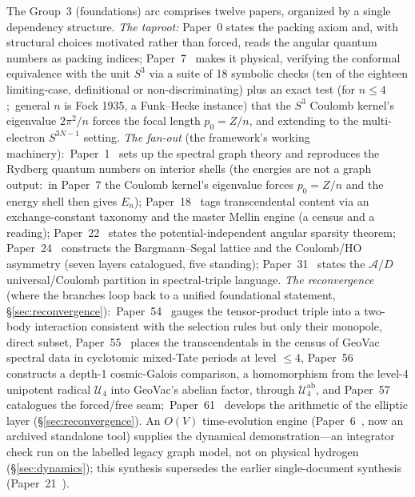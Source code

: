 \documentclass[aps,pra,twocolumn,superscriptaddress,longbibliography]{revtex4-2}
\newcommand{\gvc}[2]{#2}
\begin{document}
The Group~3 (foundations) arc comprises twelve papers, organized by a
single dependency structure.  \emph{The taproot:} Paper~0
\cite{loutey_paper0} states the packing axiom and, with structural
choices motivated rather than forced, reads the angular quantum numbers
as packing indices; Paper~7~\cite{loutey_paper7} makes
it physical, verifying the conformal equivalence with the unit $S^3$ via
\gvc{paper7-symbolic-checks}{a suite of 18 symbolic checks (ten of the eighteen limiting-case, definitional or non-discriminating)}
plus an exact test (for $n \le 4$;\ general $n$ is Fock 1935, a
Funk--Hecke instance) that the $S^3$ Coulomb kernel's eigenvalue
$2\pi^2/n$ forces the focal length $p_0 = Z/n$,
and extending to the
multi-electron $S^{3N-1}$ setting.  \emph{The fan-out} (the framework's
working machinery):\ Paper~1~\cite{loutey_paper1} sets up the spectral
graph theory and \gvc{p1-ladder-exact}{reproduces the Rydberg quantum numbers on interior
shells} (the energies are not a graph output:\ in Paper~7 the Coulomb
kernel's eigenvalue forces $p_0 = Z/n$ and the energy shell then gives
$E_n$);
Paper~18~\cite{loutey_paper18} tags transcendental content via an
exchange-constant taxonomy and the master Mellin engine (a census and a
reading);
Paper~22~\cite{loutey_paper22} states the potential-independent angular
sparsity theorem; Paper~24~\cite{loutey_paper24} constructs the
Bargmann--Segal lattice and the Coulomb/HO asymmetry (seven layers catalogued, five standing);
Paper~31~\cite{loutey_paper31} states the $\mathcal{A}/D$
universal/Coulomb partition in spectral-triple language.  \emph{The
reconvergence} (where the branches loop back to a unified foundational
statement, \S\ref{sec:reconvergence}):\ Paper~54~\cite{loutey_paper54} gauges the
tensor-product triple into a two-body interaction consistent with the
selection rules but only their monopole, direct subset, Paper~55~\cite{loutey_paper55} places
the transcendentals in the census of GeoVac spectral data in
cyclotomic mixed-Tate periods at level $\le 4$,
Paper~56~\cite{loutey_paper56} constructs a depth-1 cosmic-Galois comparison, a homomorphism
from the level-4 unipotent radical $\mathcal{U}_4$ into GeoVac's abelian factor, through
$\mathcal{U}_4^{\mathrm{ab}}$, and Paper~57~\cite{loutey_paper57}
catalogues the forced/free seam;\ Paper~61~\cite{loutey_paper61}
develops the arithmetic of the elliptic layer (\S\ref{sec:reconvergence}).  An $O(V)$ time-evolution engine
(Paper~6~\cite{loutey_paper6}, now an archived standalone tool)
supplies the dynamical demonstration---an integrator check run on the
labelled legacy graph model, not on physical hydrogen
(\S\ref{sec:dynamics}); this synthesis supersedes the
earlier single-document synthesis (Paper~21~\cite{loutey_paper21}).
\end{document}
